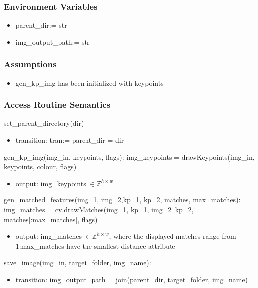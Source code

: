 \documentclass[12pt, titlepage]{article}
\begin{document}
\subsubsection{Environment Variables}
\begin{itemize}
  \item parent\_dir:= str
  \item img\_output\_path:= str
\end{itemize}

\subsubsection{Assumptions}
\begin{itemize}
  \item gen\_kp\_img has been initialized with keypoints
\end{itemize}


\subsubsection{Access Routine Semantics}

\noindent set\_parent\_directory(dir)
\begin{itemize}
  \item transition: tran:= parent\_dir = dir
\end{itemize}


\noindent gen\_kp\_img(img\_in, keypoints, flags):\newline
img\_keypoints = drawKeypoints(img\_in, keypoints, colour, flags)
\begin{itemize}
  \item output: img\_keypoints $\in \mathbb{Z}^{h \times w}$
\end{itemize}


\noindent gen\_matched\_features(img\_1, img\_2,kp\_1, kp\_2, matches, max\_matches): \newline 
img\_matches = cv.drawMatches(img\_1, kp\_1, img\_2, kp\_2, matches[:max\_matches], 
flags)
\begin{itemize}
  \item output: img\_matches $\in \mathbb{Z}^{h \times w}$, where the displayed matches 
  range from 1:max\_matches have the smallest distance attribute
\end{itemize}

save\_image(img\_in, target\_folder, img\_name):
\begin{itemize}
  \item transition: img\_output\_path = join(parent\_dir, target\_folder, img\_name)
\end{itemize}
\end{document}
